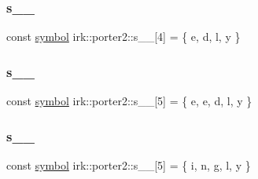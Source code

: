 \subsubsection{\texorpdfstring{s\+\_\+\_}{s\_4\_3}}
{\footnotesize\ttfamily const \mbox{\hyperlink{namespaceirk_1_1porter2_afd04c4eb58a1dabcf8f3ab2d7e9f9ed5}{symbol}} irk\+::porter2\+::s\+\_\+\_\mbox{[}4\mbox{]} = \{ \textquotesingle{}e\textquotesingle{}, \textquotesingle{}d\textquotesingle{}, \textquotesingle{}l\textquotesingle{}, \textquotesingle{}y\textquotesingle{} \}\hspace{0.3cm}{\ttfamily [static]}}

\mbox{\label{namespaceirk_1_1porter2_add32fbfe6cc4755e9866543364b760c7}} 
\subsubsection{\texorpdfstring{s\+\_\+\_}{s\_4\_4}}
{\footnotesize\ttfamily const \mbox{\hyperlink{namespaceirk_1_1porter2_afd04c4eb58a1dabcf8f3ab2d7e9f9ed5}{symbol}} irk\+::porter2\+::s\+\_\+\_\mbox{[}5\mbox{]} = \{ \textquotesingle{}e\textquotesingle{}, \textquotesingle{}e\textquotesingle{}, \textquotesingle{}d\textquotesingle{}, \textquotesingle{}l\textquotesingle{}, \textquotesingle{}y\textquotesingle{} \}\hspace{0.3cm}{\ttfamily [static]}}

\mbox{\label{namespaceirk_1_1porter2_a0479f23a4d8456604041f7b9ad675376}} 
\subsubsection{\texorpdfstring{s\+\_\+\_}{s\_4\_5}}
{\footnotesize\ttfamily const \mbox{\hyperlink{namespaceirk_1_1porter2_afd04c4eb58a1dabcf8f3ab2d7e9f9ed5}{symbol}} irk\+::porter2\+::s\+\_\+\_\mbox{[}5\mbox{]} = \{ \textquotesingle{}i\textquotesingle{}, \textquotesingle{}n\textquotesingle{}, \textquotesingle{}g\textquotesingle{}, \textquotesingle{}l\textquotesingle{}, \textquotesingle{}y\textquotesingle{} \}\hspace{0.3cm}{\ttfamily [static]}}

